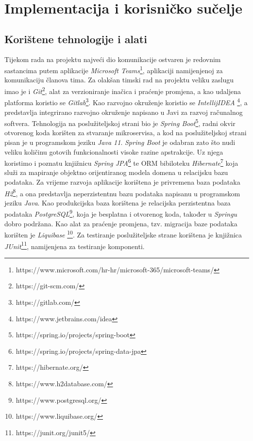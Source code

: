 \chapter{Implementacija i korisničko sučelje}
		
		
		\section{Korištene tehnologije i alati}
		
			 Tijekom rada na projektu najveći dio komunikacije ostvaren je redovnim sastancima putem aplikacije \textit{Microsoft Teams}\footnote{https://www.microsoft.com/hr-hr/microsoft-365/microsoft-teams/}, aplikaciji namijenjenoj za komunikaciju članova tima. Za olakšan timski rad na projektu veliku zaslugu imao je i \textit{Git}\footnote{https://git-scm.com/}, alat za verzioniranje inačica i praćenje promjena, a kao udaljena platforma koristio se \textit{Gitlab}\footnote{https://gitlab.com/}.\newline
			  Kao razvojno okruženje koristio se \textit{IntellijIDEA} \footnote{https://www.jetbrains.com/idea}, a predstavlja integrirano razvojno okruženje napisano u Javi za razvoj računalnog softvera. Tehnologija na poslužiteljskoj strani bio je \textit{Spring Boot}\footnote{https://spring.io/projects/spring-boot}, radni okvir otvorenog koda korišten za stvaranje mikroservisa, a kod na poslužiteljskoj strani pisan je u programskom jeziku \textit{Java 11}. \textit{Spring Boot} je odabran zato što nudi veliku količinu gotovih funkcionalnosti visoke razine apstrakcije. Uz njega koristimo i poznatu knjižnicu \textit{Spring JPA}\footnote{https://spring.io/projects/spring-data-jpa} te ORM bibiloteku \textit{Hibernate}\footnote{https://hibernate.org/} koja služi za mapiranje objektno orijentiranog modela domena u relacijsku bazu podataka. Za vrijeme razvoja aplikacije korištena je privremena baza podataka \textit{H2}\footnote{https://www.h2database.com/}, a ona predstavlja neperzistentnu bazu podataka napisanu u programskom jeziku \textit{Java}. Kao produkcijska baza korištena je relacijska perzistentna baza podataka \textit{PostgreSQL}\footnote{https://www.postgresql.org/}, koja je besplatna i otvorenog koda, također u \textit{Springu} dobro podržana. Kao alat za praćenje promjena, tzv. migracija baze podataka korišten je \textit{Liquibase} \footnote{https://www.liquibase.org/}. Za testiranje poslužiteljske strane korištena je knjižnica \textit{JUnit}\footnote{https://junit.org/junit5/}, namijenjena za testiranje komponenti.

